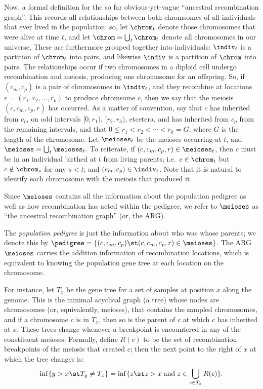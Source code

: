 Now, a formal definition for the so far obvious-yet-vague ``ancestral recombination graph''.
This records all relationships between both chromsomes of all individuals that ever lived in the population:
so, let $\chrom_t$ denote those chromosomes that were alive at time $t$,
and let $\chrom = \bigcup_t \chrom_t$ denote all chromosomes in our universe,
These are furthermore grouped together into individuals:
$\indiv_t$ is a partition of $\chrom_t$ into pairs, and likewise $\indiv$ is a partition of $\chrom$ into pairs.
The relationships occur if two chromosomes in a diploid cell undergo recombination and meiosis,
producing one chromosome for an offspring.
So, if $(c_m,c_p)$ is a pair of chromosomes in $\indiv_t$,
and they recombine at locations $r=(r_1,r_2,\ldots,r_k)$
to produce chromsome $c$,
then we say that the meiosis $(c,c_m,c_p,r)$ has occurred.
As a matter of convention, say that $c$ has inherited from $c_m$ 
on odd intervals $[0,r_1)$, $[r_2,r_3)$, etcetera,
and has inherited from $c_p$ from the remaining intervals,
and that $0 \le r_1 < r_2 < \cdots < r_k = G$, where $G$ is the length of the chromosome.
Let $\meioses_t$ be the meioses occurring at $t$,
and $\meioses = \bigcup_t \meioses_t$.
To reiterate, if $(c,c_m,c_p,r) \in \meioses_t$, then
$c$ must be in an individual birthed at $t$ from living parents; 
i.e.\ $c \in \chrom_t$ but $c \notin \chrom_s$ for any $s<t$;
and $(c_m,c_p) \in \indiv_t$.
Note that it is natural to identify each chromosome with the meiosis that produced it.

Since $\meioses$ contains all the information about the population pedigree
as well as how recombination has acted within the pedigree,
we refer to $\meioses$ as ``the ancestral recombination graph'' (or, the ARG).

The \emph{population pedigree} is just the information about who was whose parents;
we denote this by $\pedigree = \{ (c,c_m,c_p) \st (c,c_m,c_p,r) \in \meioses \}$.
The ARG $\meioses$ carries the addition information of recombination locations,
which is equivalent to knowing the population gene tree at each location on the chromosome.


For instance, let $T_x$ be the gene tree for a set of samples at position $x$ along the genome.
This is the minimal acyclical graph (a tree) whose nodes are chromosomes (or, equivalently, meioses), 
that contains the sampled chromosomes,
and if a chromosome $c$ is in $T_x$, then so is the parent of $c$ at which $c$ has inherited at $x$.
These trees change whenever a breakpoint is encountered in any of the constituent meioses:
Formally, define $R(c)$ to be the set of recombination breakpoints of the meiosis that created $c$;
then the next point to the right of $x$ at which the tree changes is:
\begin{align}
  \inf\{ y > x \st T_y \neq T_x \} = \inf\{ z \st z > x \; \text{and} \; z \in \bigcup_{c\in T_x} R(c) \} .
\end{align}


